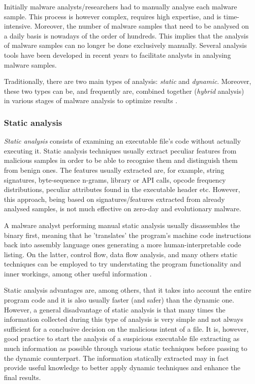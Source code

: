 \documentclass[pdfa%
,cucitura%
]{toptesi}
\begin{document}
Initially malware analysts/researchers had to manually analyse each malware sample. This process is however complex, requires high expertise, and is time-intensive. Moreover, the number of malware samples that need to be analysed on a daily basis is nowadays of the order of hundreds. This implies that the analysis of malware samples can no longer be done exclusively manually. Several analysis tools have been developed in recent years to facilitate analysts in analysing malware samples.

Traditionally, there are two main types of analysis: \textit{static} and \textit{dynamic}. Moreover, these two types can be, and frequently are, combined together (\textit{hybrid} analysis) in various stages of malware analysis to optimize results \cite{NamanyaTWM}.

\subsubsection{Static analysis}
\textit{Static analysis} consists of examining an executable file's code without actually executing it. Static analysis techniques usually extract peculiar features from malicious samples in order to be able to recognise them and distinguish them from benign ones. The features usually extracted are, for example, string signatures, byte-sequence n-grams, library or API calls, opcode frequency distributions, peculiar attributes found in the executable header etc. However, this approach, being based on signatures/features extracted from already analysed samples, is not much effective on zero-day and evolutionary malware.

A malware analyst performing manual static analysis usually disassembles the binary first, meaning that he 'translates' the program's machine code instructions back into assembly language ones generating a more human-interpretable code listing. On the latter, control flow, data flow analysis, and many others static techniques can be employed to try understating the program functionality and inner workings, among other useful information \cite{BayerDAMC}.

Static analysis advantages are, among others, that it takes into account the entire program code and it is also usually faster (and safer) than the dynamic one. However, a general disadvantage of static analysis is that many times the information collected during this type of analysis is very simple and not always sufficient for a conclusive decision on the malicious intent of a file. It is, however, good practice to start the analysis of a suspicious executable file extracting as much information as possible through various static techniques before passing to the dynamic counterpart. The information statically extracted may in fact provide useful knowledge to better apply dynamic techniques and enhance the final results.
\end{document}
